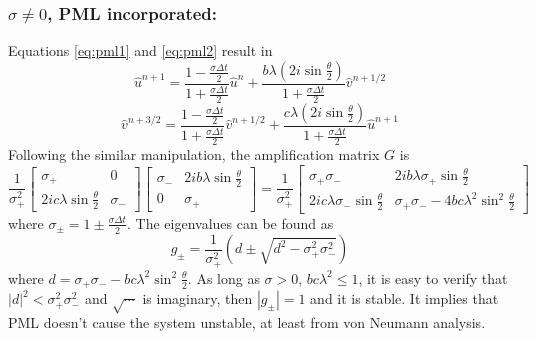 \subsubsection{$\sigma\neq0$, PML incorporated:}
Equations \eqref{eq:pml1} and \eqref{eq:pml2} result in
\begin{equation}
 \hat{u}^{n+1}=\frac{1-\frac{\sigma\Delta t}{2}}{1+\frac{\sigma\Delta t}{2}}\hat{u}^n+\frac{b\lambda(2i\sin\frac{\theta}{2})}{1+\frac{\sigma\Delta t}{2}}\hat{v}^{n+1/2}
\end{equation}
\begin{equation}
 \hat{v}^{n+3/2}=\frac{1-\frac{\sigma\Delta t}{2}}{1+\frac{\sigma\Delta t}{2}}\hat{v}^{n+1/2}+
 \frac{c\lambda(2i\sin\frac{\theta}{2})}{1+\frac{\sigma\Delta t}{2}}\hat{u}^{n+1}
\end{equation}
Following the similar manipulation, the amplification matrix $G$ is
\begin{equation}
 \frac{1}{\sigma_{+}^2}\begin{bmatrix}
                        \sigma_{+} & 0\\
                        2ic\lambda \sin\frac{\theta}{2} & \sigma_{-}
                       \end{bmatrix}
                       \begin{bmatrix}
                        \sigma_{-} & 2ib\lambda \sin\frac{\theta}{2}\\
                        0 & \sigma_{+}
                       \end{bmatrix}
=\frac{1}{\sigma_{+}^2}\begin{bmatrix}
                        \sigma_{+}\sigma_{-} & 2ib\lambda \sigma_{+}\sin\frac{\theta}{2}\\
                        2ic\lambda \sigma_{-}\sin\frac{\theta}{2} & \sigma_{+}\sigma_{-}-4bc\lambda^2\sin^2\frac{\theta}{2}  
			\end{bmatrix}                       
\end{equation}
where $\sigma_{\pm}=1\pm \frac{\sigma\Delta t}{2}$.
The eigenvalues can be found as
\begin{equation}
 g_{\pm}=\frac{1}{\sigma_{+}^2}\left(
 d\pm \sqrt{ d^2-\sigma_{+}^2\sigma_{-}^2}
 \right)
\end{equation}
where $d=\sigma_{+}\sigma_{-}-bc\lambda^2\sin^2\frac{\theta}{2}$.
 As long as $\sigma>0$,  $bc\lambda^2\leq 1$, it is easy to verify that $|d|^2<\sigma_{+}^2\sigma_{-}^2$ and $\sqrt{\cdots}$ is imaginary, then $|g_{\pm}|=1$ and it is stable. It implies that PML doesn't cause the system unstable, at least from von Neumann analysis.

